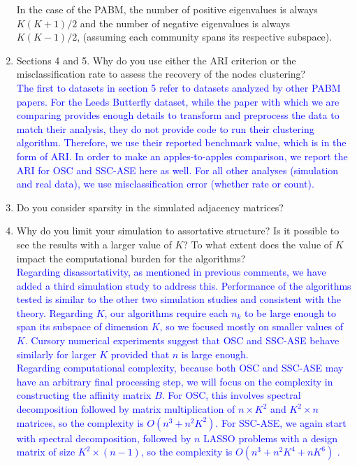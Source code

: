 \documentclass[
]{article}
\begin{document}
\begin{enumerate}
{  In the case of the PABM, the number of positive eigenvalues is always $K (K + 1) / 2$ and the number of negative eigenvalues is always $K (K - 1) / 2$, (assuming each community spans its respective subspace). 
  }
\item
  Sections 4 and 5. Why do you use either the ARI criterion or the
  misclassification rate to assess the recovery of the nodes
  clustering?\\
  \textcolor{blue}{
  The first to datasets in section 5 refer to datasets analyzed by other PABM papers. 
  For the Leeds Butterfly dataset, while the paper with which we are comparing \citep{noroozi2019estimation} provides enough details to transform and preprocess the data to match their analysis, they do not provide code to run their clustering algorithm. 
  Therefore, we use their reported benchmark value, which is in the form of ARI. 
  In order to make an apples-to-apples comparison, we report the ARI for OSC and SSC-ASE here as well. 
  For all other analyses (simulation and real data), we use misclassification error (whether rate or count). 
  }
\item
  Do you consider sparsity in the simulated adjacency matrices?
\item
  Why do you limit your simulation to assortative structure? Is it
  possible to see the results with a larger value of \(K\)? To what
  extent does the value of \(K\) impact the computational burden for the
  algorithms?\\
  \textcolor{blue}{
  Regarding disassortativity, as mentioned in previous comments, we have added a third simulation study to address this. 
  Performance of the algorithms tested is similar to the other two simulation studies and consistent with the theory. 
  Regarding $K$, our algorithms require each $n_k$ to be large enough to span its subspace of dimension $K$, so we focused mostly on smaller values of $K$. 
  Cursory numerical experiments suggest that OSC and SSC-ASE behave similarly for larger $K$ provided that $n$ is large enough. 
  }\\
  \textcolor{blue}{
  Regarding computational complexity, because both OSC and SSC-ASE may have an arbitrary final processing step, we will focus on the complexity in constructing the affinity matrix $B$. 
  For OSC, this involves spectral decomposition followed by matrix multiplication of $n \times K^2$ and $K^2 \times n$ matrices, so the complexity is $O(n^3 + n^2 K^2)$. 
  For SSC-ASE, we again start with spectral decomposition, followed by $n$ LASSO problems with a design matrix of size $K^2 \times (n - 1)$, so the complexity is $O(n^3 + n^2 K^4 + n K^6)$ \cite{10.1214/009053604000000067}. 
}
\end{enumerate}
\end{document}
